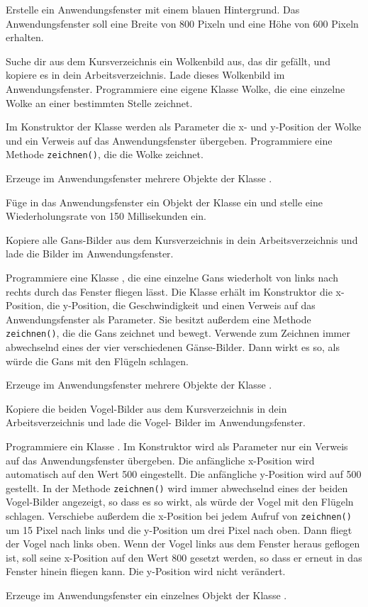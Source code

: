 \begin{compactenum}[a)]
\item Erstelle ein Anwendungsfenster mit einem blauen Hintergrund. Das
 Anwendungsfenster soll eine Breite von 800 Pixeln und eine Höhe von 600 Pixeln
 erhalten.

\item Suche dir aus dem Kursverzeichnis ein Wolkenbild aus, das dir gefällt, und
kopiere es in dein Arbeitsverzeichnis. Lade dieses Wolkenbild im Anwendungsfenster.
Programmiere eine eigene Klasse Wolke, die eine einzelne Wolke an einer
bestimmten Stelle zeichnet.

Im Konstruktor der Klasse werden als Parameter die x- und y-Position der Wolke
und ein Verweis auf das Anwendungsfenster übergeben. Programmiere eine Methode
\lstinline|zeichnen()|, die die Wolke zeichnet.

Erzeuge im Anwendungsfenster mehrere Objekte der Klasse .

\item Füge in das Anwendungsfenster ein Objekt der Klasse  ein
und stelle eine Wiederholungsrate von 150 Millisekunden ein.

\item Kopiere alle Gans-Bilder aus dem Kursverzeichnis in dein
Arbeitsverzeichnis und lade die Bilder im Anwendungsfenster.

Programmiere eine Klasse , die eine einzelne Gans wiederholt von
links nach rechts durch das Fenster fliegen lässt. Die Klasse erhält im
Konstruktor die x-Position, die y-Position, die Geschwindigkeit und einen
Verweis auf das Anwendungsfenster als Parameter. Sie besitzt außerdem eine
Methode \lstinline|zeichnen()|, die die Gans zeichnet und bewegt. Verwende zum
Zeichnen immer abwechselnd eines der vier verschiedenen Gänse-Bilder. Dann wirkt
es so, als würde die Gans mit den Flügeln schlagen.

Erzeuge im Anwendungsfenster mehrere Objekte der Klasse .

\item Kopiere die beiden Vogel-Bilder aus dem Kursverzeichnis in dein
Arbeitsverzeichnis und lade die Vogel- Bilder im Anwendungsfenster.

Programmiere ein Klasse . Im Konstruktor wird als Parameter nur
ein Verweis auf das Anwendungsfenster übergeben. Die anfängliche x-Position
wird automatisch auf den Wert 500 eingestellt. Die anfängliche y-Position wird
auf 500 gestellt. In der Methode \lstinline|zeichnen()| wird immer abwechselnd
eines der beiden Vogel-Bilder angezeigt, so dass es so wirkt, als würde der
Vogel mit den Flügeln schlagen. Verschiebe außerdem die x-Position bei jedem
Aufruf von \lstinline|zeichnen()| um 15 Pixel nach links und die y-Position um
drei Pixel nach oben. Dann fliegt der Vogel nach links oben. Wenn der Vogel
links aus dem Fenster heraus geflogen ist, soll seine x-Position auf den Wert
800 gesetzt werden, so dass er erneut in das Fenster hinein fliegen kann. Die
y-Position wird nicht verändert.

Erzeuge im Anwendungsfenster ein einzelnes Objekt der Klasse .
\end{compactenum}


